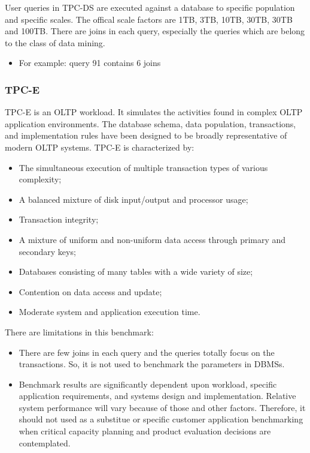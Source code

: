User queries in TPC-DS are executed against a database to specific population and specific scales. The offical 
scale factors are 1TB, 3TB, 10TB, 30TB, 30TB and 100TB. There are joins in each query, especially the queries 
which are belong to the class of data mining.

\begin{itemize}
	\item For example: query 91 contains 6 joins
\end{itemize}

\subsubsection{TPC-E}

TPC-E \cite{TPC} is an OLTP workload. It simulates the activities found in complex OLTP application environments. 
The database schema, data population, transactions, and implementation rules have been designed to be broadly 
representative of modern OLTP systems. TPC-E is characterized by:

\begin{itemize}
	\item The simultaneous execution of multiple transaction types of various complexity;
	\item A balanced mixture of disk input/output and processor usage;
	\item Transaction integrity;
	\item A mixture of uniform and non-uniform data access through primary and secondary keys;
	\item Databases consisting of many tables with a wide variety of size;
	\item Contention on data access and update;
	\item Moderate system and application execution time.
\end{itemize}

There are limitations in this benchmark:

\begin{itemize}
	\item There are few joins in each query and the queries totally focus on the transactions. So, it 
	is not used to benchmark the parameters in DBMSs.
	\item Benchmark results are significantly dependent upon workload, specific application requirements, 
	and systems design and implementation. Relative system performance will vary because of those and other 
	factors. Therefore, it should not used as a substitue or specific customer application benchmarking 
	when critical capacity planning and product evaluation decisions are contemplated.
\end{itemize}

